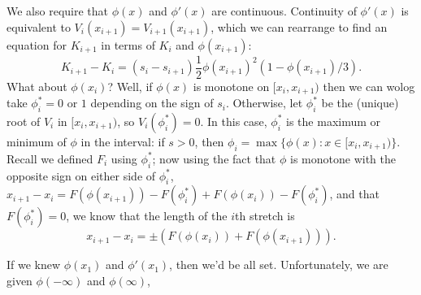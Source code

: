 \documentclass{article}
\begin{document}
We also require that $\phi(x)$ and $\phi'(x)$ are continuous.
Continuity of $\phi'(x)$ is equivalent to $V_i(x_{i+1}) = V_{i+1}(x_{i+1})$,
which we can rearrange to find an equation for $K_{i+1}$ in terms of $K_i$ and $\phi(x_{i+1})$:
\[
    K_{i+1} - K_i = (s_i - s_{i+1}) \frac{1}{2} \phi(x_{i+1})^2 (1-\phi(x_{i+1})/3) .
\]
What about $\phi(x_i)$?  Well, if $\phi(x)$ is monotone on $[x_i,x_{i+1})$ then we can wolog take $\phi_i^*=0$ or $1$ depending on the sign of $s_i$.
Otherwise, let $\phi_i^*$ be the (unique) root of $V_i$ in $[x_i,x_{i+1})$, so $V_i(\phi_i^*)=0$.
In this case, $\phi_i^*$ is the maximum or minimum of $\phi$ in the interval:
if $s>0$, then $\phi_i = \max\{ \phi(x) : x \in [x_i,x_{i+1})\}$. 
Recall we defined $F_i$ using $\phi_i^*$; now using the fact that $\phi$ is monotone with the opposite sign on either side of $\phi_i^*$,
$x_{i+1} - x_i = F(\phi(x_{i+1})) - F(\phi_i^*) + F(\phi(x_{i})) - F(\phi_i^*)$,
and that $F(\phi_i^*) = 0$,
we know that the length of the $i$th stretch is
\[
    x_{i+1} - x_i = \pm \left( F(\phi(x_i)) + F(\phi(x_{i+1})) \right).
\]

If we knew $\phi(x_1)$ and $\phi'(x_1)$, then we'd be all set.
Unfortunately, we are given $\phi(-\infty)$ and $\phi(\infty)$,
\end{document}
